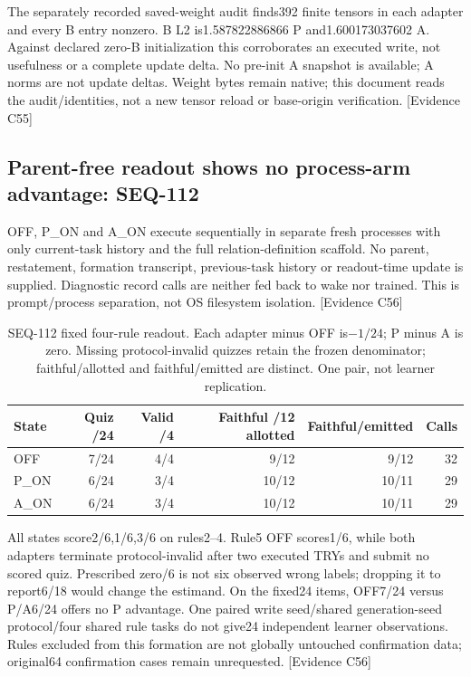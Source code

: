 \documentclass[11pt]{article}
\newcommand{\ev}[1]{\textsf{[Evidence #1]}}
\begin{document}
The separately recorded saved-weight audit finds392 finite tensors in each
adapter and every B entry nonzero. B L2 is1.587822886866 P and1.600173037602 A.
Against declared zero-B initialization this corroborates an executed write,
not usefulness or a complete update delta. No pre-init A snapshot is available;
A norms are not update deltas. Weight bytes remain native; this document reads
the audit/identities, not a new tensor reload or base-origin verification. \ev{C55}

\subsection{Parent-free readout shows no process-arm advantage: SEQ-112}
OFF, P\_ON and A\_ON execute sequentially in separate fresh processes with only
current-task history and the full relation-definition scaffold. No parent,
restatement, formation transcript, previous-task history or readout-time update
is supplied. Diagnostic record calls are neither fed back to wake nor trained.
This is prompt/process separation, not OS filesystem isolation. \ev{C56}

\begin{table}[ht]
\centering\small
\begin{tabular}{lrrrrr}
\toprule
State & Quiz /24 & Valid /4 & Faithful /12 allotted & Faithful/emitted & Calls \\
\midrule
OFF & 7/24 & 4/4 & 9/12 & 9/12 & 32 \\
P\_ON & 6/24 & 3/4 & 10/12 & 10/11 & 29 \\
A\_ON & 6/24 & 3/4 & 10/12 & 10/11 & 29 \\
\bottomrule
\end{tabular}
\caption{SEQ-112 fixed four-rule readout. Each adapter minus OFF is$-1/24$;
P minus A is zero. Missing protocol-invalid quizzes retain the frozen denominator;
faithful/allotted and faithful/emitted are distinct. One pair, not learner replication.}
\label{tab:seq112-parentfree}
\end{table}

All states score2/6,1/6,3/6 on rules2--4. Rule5 OFF scores1/6, while both adapters
terminate protocol-invalid after two executed TRYs and submit no scored quiz.
Prescribed zero/6 is not six observed wrong labels; dropping it to report6/18
would change the estimand. On the fixed24 items, OFF7/24 versus P/A6/24 offers
no P advantage. One paired write seed/shared generation-seed protocol/four
shared rule tasks do not give24 independent learner observations. Rules excluded
from this formation are not globally untouched confirmation data; original64
confirmation cases remain unrequested. \ev{C56}
\end{document}
